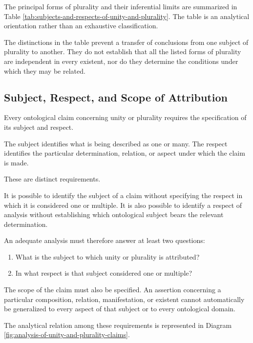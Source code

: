 The principal forms of plurality and their
inferential limits are summarized in Table
\ref{tab:subjects-and-respects-of-unity-and-plurality}.
The table is an analytical orientation rather
than an exhaustive classification.



The distinctions in the table prevent a transfer
of conclusions from one subject of plurality
to another. They do not establish that all
the listed forms of plurality are independent
in every existent, nor do they determine
the conditions under which they may be related.

\subsection{Subject, Respect, and Scope of Attribution}

Every ontological claim concerning unity or plurality
requires the specification of its subject and respect.

The subject identifies what is being described
as one or many. The respect identifies the particular
determination, relation, or aspect under which
the claim is made.

These are distinct requirements.

It is possible to identify the subject of a claim
without specifying the respect in which it is
considered one or multiple. It is also possible
to identify a respect of analysis without
establishing which ontological subject bears
the relevant determination.

An adequate analysis must therefore answer
at least two questions:

\begin{enumerate}
    \item What is the subject to which unity
    or plurality is attributed?

    \item In what respect is that subject
    considered one or multiple?
\end{enumerate}

The scope of the claim must also be specified.
An assertion concerning a particular composition,
relation, manifestation, or existent cannot
automatically be generalized to every aspect
of that subject or to every ontological domain.

The analytical relation among these requirements
is represented in Diagram
\ref{fig:analysis-of-unity-and-plurality-claims}.

